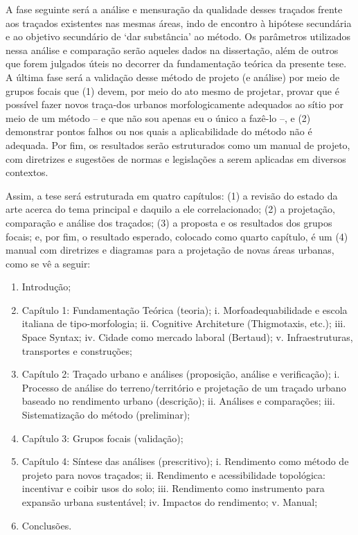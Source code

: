 \documentclass[twoside, 12pt, english,italian,latin,greek,french,spanish,brazil]{book}
\begin{document}
        A fase seguinte será a análise e mensuração da qualidade desses traçados frente aos traçados existentes nas mesmas áreas, indo de encontro à hipótese secundária e ao objetivo secundário de ‘dar substância’ ao método. Os parâmetros utilizados nessa análise e comparação serão aqueles dados na dissertação, além de outros que forem julgados úteis no decorrer da fundamentação teórica da presente tese. A última fase será a validação desse método de projeto (e análise) por meio de grupos focais que (1) devem, por meio do ato mesmo de projetar, provar que é possível fazer novos traça-dos urbanos morfologicamente adequados ao sítio por meio de um método – e que não sou apenas eu o único a fazê-lo –, e (2) demonstrar pontos falhos ou nos quais a aplicabilidade do método não é adequada. Por fim, os resultados serão estruturados como um manual de projeto, com diretrizes e sugestões de normas e legislações a serem aplicadas em diversos contextos.

        Assim, a tese será estruturada em quatro capítulos: (1) a revisão do estado da arte acerca do tema principal e daquilo a ele correlacionado; (2) a projetação, comparação e análise dos traçados; (3) a proposta e os resultados dos grupos focais; e, por fim, o resultado esperado, colocado como quarto capítulo, é um (4) manual com diretrizes e diagramas para a projetação de novas áreas urbanas, como se vê a seguir:
        \begin{enumerate}
            \item	Introdução;
            \item	Capítulo 1: Fundamentação Teórica (teoria);
                \subitem i.	Morfoadequabilidade e escola italiana de tipo-morfologia;
                \subitem ii.	Cognitive Architeture (Thigmotaxis, etc.);
                \subitem iii.	Space Syntax; 
                \subitem iv.	Cidade como mercado laboral (Bertaud);
                \subitem v.	Infraestruturas, transportes e construções;
            \item	Capítulo 2: Traçado urbano e análises (proposição, análise e verificação);
                \subitem i.	Processo de análise do terreno/território e projetação de um traçado urbano baseado no rendimento urbano (descrição);
                \subitem ii.	Análises e comparações;
                \subitem iii.	Sistematização do método (preliminar);
            \item Capítulo 3: Grupos focais (validação);
            \item Capítulo 4: Síntese das análises (prescritivo);
                \subitem i.	Rendimento como método de projeto para novos traçados;
                \subitem ii.	Rendimento e acessibilidade topológica: incentivar e coibir usos do solo;
                \subitem iii.	Rendimento como instrumento para expansão urbana sustentável;
                \subitem iv.	Impactos do rendimento;
                \subitem v.	Manual;
            \item Conclusões.
        \end{enumerate}
\end{document}

